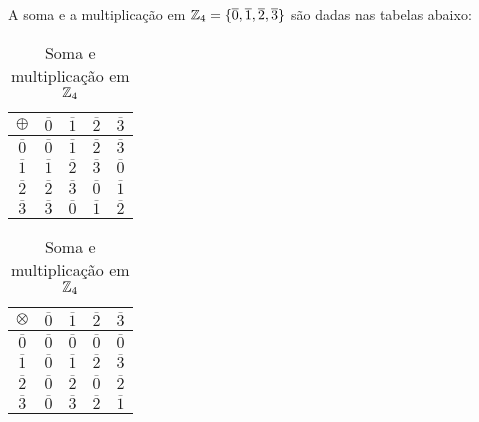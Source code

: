 \begin{exemplo}
    A soma e a multiplicação em $\mathbb{Z}_4 = \{\overline{0},\overline{1},\overline{2},\overline{3}\}$
    são dadas nas tabelas abaixo:
        \begin{table}[!htb]
          \caption{Soma e multiplicação em $\mathbb{Z}_4$}
          \begin{minipage}{.5\linewidth}
            \centering
             \begin{tabular}{|c|c|c|c|c|}
                \hline
                $\oplus$ & $\overline{0}$ & $\overline{1}$ & $\overline{2}$ & $\overline{3}$\T\\
                \hline
                $\overline{0}$ & $\overline{0}$ & $\overline{1}$ & $\overline{2}$ & $\overline{3}$\T\\
                \hline
                $\overline{1}$ & $\overline{1}$ & $\overline{2}$ & $\overline{3}$ & $\overline{0}$\T\\
                \hline
                $\overline{2}$ & $\overline{2}$ & $\overline{3}$ & $\overline{0}$ & $\overline{1}$\T\\
                \hline
                $\overline{3}$ & $\overline{3}$ & $\overline{0}$ & $\overline{1}$ & $\overline{2}$\T\\
                \hline
            \end{tabular}
          \end{minipage}
          \begin{minipage}{.5\linewidth}
          \centering
            \begin{tabular}{|c|c|c|c|c|}
              \hline
              $\otimes$ & $\overline{0}$ & $\overline{1}$ & $\overline{2}$ & $\overline{3}$\T\\
              \hline
              $\overline{0}$ & $\overline{0}$ & $\overline{0}$ & $\overline{0}$ & $\overline{0}$\T\\
              \hline
              $\overline{1}$ & $\overline{0}$ & $\overline{1}$ & $\overline{2}$ & $\overline{3}$\T\\
              \hline
              $\overline{2}$ & $\overline{0}$ & $\overline{2}$ & $\overline{0}$ & $\overline{2}$\T\\
              \hline
              $\overline{3}$ & $\overline{0}$ & $\overline{3}$ & $\overline{2}$ & $\overline{1}$\T\\
              \hline
            \end{tabular}
        \end{minipage}
    \end{table}
\end{exemplo}

